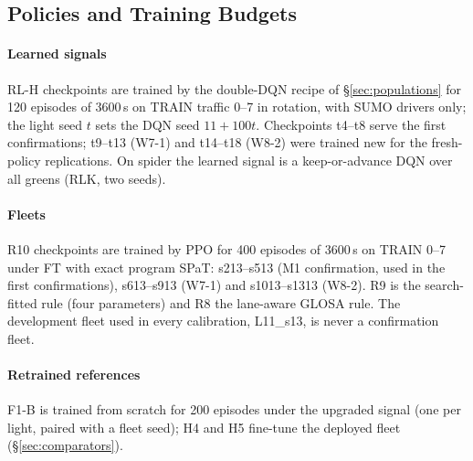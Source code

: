 \subsection{Policies and Training Budgets}
\paragraph{Learned signals} RL-H checkpoints are trained by the double-DQN recipe of §\ref{sec:populations} for 120 episodes of 3600\,s on
TRAIN traffic 0--7 in rotation, with SUMO drivers only; the light seed $t$ sets the DQN seed $11+100t$. Checkpoints t4--t8 serve the first
confirmations; t9--t13 (W7-1) and t14--t18 (W8-2) were trained new for the fresh-policy replications. On spider the learned signal is a
keep-or-advance DQN over all greens (RLK, two seeds).
\paragraph{Fleets} R10 checkpoints are trained by PPO for 400 episodes of 3600\,s on TRAIN 0--7 under FT with exact program SPaT: s213--s513
(M1 confirmation, used in the first confirmations), s613--s913 (W7-1) and s1013--s1313 (W8-2). R9 is the search-fitted rule
(four parameters) and R8 the lane-aware GLOSA rule. The development fleet used in every calibration, L11\_s13, is never a confirmation
fleet.
\paragraph{Retrained references} F1-B is trained from scratch for 200 episodes under the upgraded signal (one per light, paired with a
fleet seed); H4 and H5 fine-tune the deployed fleet (§\ref{sec:comparators}).

